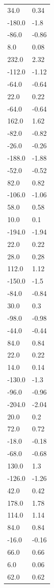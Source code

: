 \begin{longtable}{ll}
34.0 & 0.34 \\
-180.0 & -1.8 \\
-86.0 & -0.86 \\
8.0 & 0.08 \\
232.0 & 2.32 \\
-112.0 & -1.12 \\
-64.0 & -0.64 \\
22.0 & 0.22 \\
-64.0 & -0.64 \\
162.0 & 1.62 \\
-82.0 & -0.82 \\
-26.0 & -0.26 \\
-188.0 & -1.88 \\
-52.0 & -0.52 \\
82.0 & 0.82 \\
-106.0 & -1.06 \\
58.0 & 0.58 \\
10.0 & 0.1 \\
-194.0 & -1.94 \\
22.0 & 0.22 \\
28.0 & 0.28 \\
112.0 & 1.12 \\
-150.0 & -1.5 \\
-84.0 & -0.84 \\
30.0 & 0.3 \\
-98.0 & -0.98 \\
-44.0 & -0.44 \\
84.0 & 0.84 \\
22.0 & 0.22 \\
14.0 & 0.14 \\
-130.0 & -1.3 \\
-96.0 & -0.96 \\
-204.0 & -2.04 \\
20.0 & 0.2 \\
72.0 & 0.72 \\
-18.0 & -0.18 \\
-68.0 & -0.68 \\
130.0 & 1.3 \\
-126.0 & -1.26 \\
42.0 & 0.42 \\
178.0 & 1.78 \\
114.0 & 1.14 \\
84.0 & 0.84 \\
-16.0 & -0.16 \\
66.0 & 0.66 \\
6.0 & 0.06 \\
62.0 & 0.62 \\

\end{longtable}

